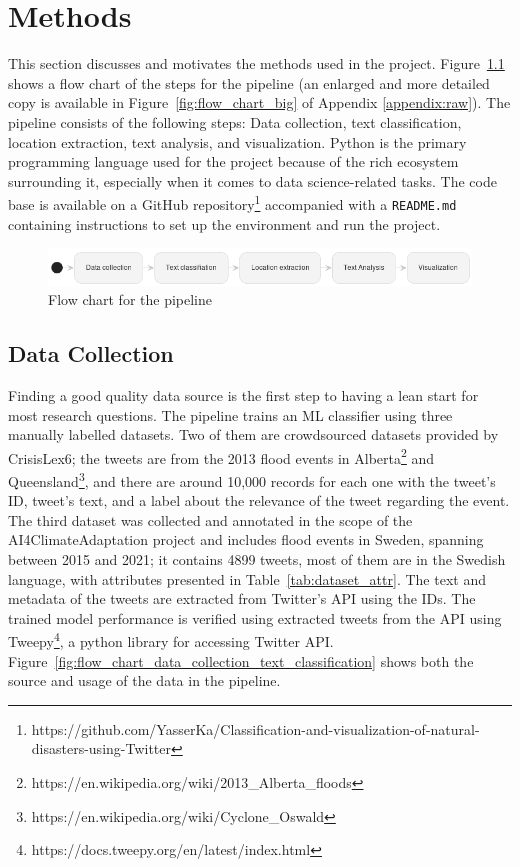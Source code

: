 \chapter{Methods}

This section discusses and motivates the methods used in the project. Figure~\ref{fig:flow_chart}
shows a flow chart of the steps for the pipeline (an enlarged and more detailed copy is available in
Figure~\ref{fig:flow_chart_big} of Appendix \ref{appendix:raw}). The pipeline consists of the
following steps: Data collection, text classification, location extraction, text analysis, and visualization.
Python is the primary programming language used for the project because of the rich ecosystem
surrounding it, especially when it comes to data science-related tasks. The code base is available
on a GitHub
repository\footnote{https://github.com/YasserKa/Classification-and-visualization-of-natural-disasters-using-Twitter}
accompanied with a \texttt{README.md} containing instructions to set up the environment and run the
project.

\begin{figure}[H]
\begin{center}
  \includegraphics[width=\columnwidth]{./images/pipeline_concise.png}
\end{center}
\caption{Flow chart for the pipeline}
\label{fig:flow_chart}
\end{figure}

\section{Data Collection}

Finding a good quality data source is the first step to having a lean start for most research
questions. The pipeline trains an \ac{ML} classifier using three manually labelled datasets. Two of
them are crowdsourced datasets provided by CrisisLex6; the tweets are from the 2013 flood events in
Alberta\footnote{https://en.wikipedia.org/wiki/2013\_Alberta\_floods} and
Queensland\footnote{https://en.wikipedia.org/wiki/Cyclone\_Oswald}, and there are around 10,000
records for each one with the tweet's ID, tweet's text, and a label about the relevance of the tweet
regarding the event. The third dataset was collected and annotated in the scope of the
AI4ClimateAdaptation project and includes flood events in Sweden, spanning between 2015 and 2021; it
contains 4899 tweets, most of them are in the Swedish language, with attributes presented in
Table~\ref{tab:dataset_attr}. The text and metadata of the tweets are extracted from Twitter's
\ac{API} using the IDs. The trained model performance is verified using extracted tweets from the
\ac{API} using Tweepy\footnote{https://docs.tweepy.org/en/latest/index.html}, a python library for
accessing Twitter \ac{API}. Figure~\ref{fig:flow_chart_data_collection_text_classification} shows
both the source and usage of the data in the pipeline.

